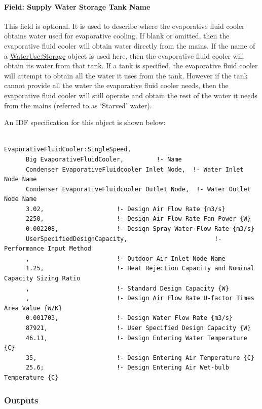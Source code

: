 \paragraph{Field: Supply Water Storage Tank Name}\label{field-supply-water-storage-tank-name-4}

This field is optional. It is used to describe where the evaporative fluid cooler obtains water used for evaporative cooling. If blank or omitted, then the evaporative fluid cooler will obtain water directly from the mains. If the name of a \hyperref[waterusestorage]{WaterUse:Storage} object is used here, then the evaporative fluid cooler will obtain its water from that tank. If a tank is specified, the evaporative fluid cooler will attempt to obtain all the water it uses from the tank. However if the tank cannot provide all the water the evaporative fluid cooler needs, then the evaporative fluid cooler will still operate and obtain the rest of the water it needs from the mains (referred to as `Starved' water).

An IDF specification for this object is shown below:

\begin{lstlisting}

EvaporativeFluidCooler:SingleSpeed,
      Big EvaporativeFluidCooler,         !- Name
      Condenser EvaporativeFluidcooler Inlet Node,  !- Water Inlet Node Name
      Condenser EvaporativeFluidcooler Outlet Node,  !- Water Outlet Node Name
      3.02,                    !- Design Air Flow Rate {m3/s}
      2250,                    !- Design Air Flow Rate Fan Power {W}
      0.002208,                !- Design Spray Water Flow Rate {m3/s}
      UserSpecifiedDesignCapacity,                        !- Performance Input Method
      ,                        !- Outdoor Air Inlet Node Name
      1.25,                    !- Heat Rejection Capacity and Nominal Capacity Sizing Ratio
      ,                        !- Standard Design Capacity {W}
      ,                        !- Design Air Flow Rate U-factor Times Area Value {W/K}
      0.001703,                !- Design Water Flow Rate {m3/s}
      87921,                   !- User Specified Design Capacity {W}
      46.11,                   !- Design Entering Water Temperature {C}
      35,                      !- Design Entering Air Temperature {C}
      25.6;                    !- Design Entering Air Wet-bulb Temperature {C}
\end{lstlisting}

\subsubsection{Outputs}\label{outputs-6-001}

